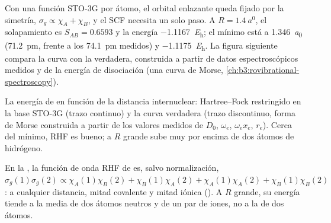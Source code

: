 \begin{example}\label{ex:b3:computational-chemistry:h2}
Con una función STO-3G por átomo, el orbital enlazante queda fijado por la simetría,
$\sigma_g \propto \chi_A + \chi_B$, y el SCF necesita un solo paso. A $R =
\qty{1.4}{\bohr}$, el solapamiento es $S_{AB} = 0.6593$ y la energía
\qty{-1.1167}{\hartree}; el mínimo está a \qty{1.346}{\bohr} (\qty{71.2}{pm},
frente a los \qty{74.1}{pm} medidos) y \qty{-1.1175}{\hartree}. La figura siguiente
compara la curva con la verdadera, construida a partir de datos espectroscópicos
medidos y de la energía de disociación (una curva de Morse, \cref{ch:b3:rovibrational-spectroscopy}).
\end{example}

\begin{omfigure}

{\small La energía de  en función de la distancia internuclear: Hartree--Fock
restringido en la base STO-3G (trazo continuo) y la curva verdadera (trazo discontinuo, forma
de Morse construida a partir de los valores medidos de $D_0$, $\omega_e$, $\omega_ex_e$, $r_e$). Cerca del
mínimo, RHF es bueno; a $R$ grande sube muy por encima de dos átomos de hidrógeno.}
\end{omfigure}

\begin{proposition}\label{prop:b3:computational-chemistry:rhf-dissociation}
En la , la función de onda RHF de  es, salvo
normalización, $\sigma_g(1)\sigma_g(2) \propto \chi_A(1)\chi_B(2) + \chi_B(1)\chi_A(2)
+ \chi_A(1)\chi_A(2) + \chi_B(1)\chi_B(2)$: a cualquier distancia, mitad covalente y mitad
iónica (). A $R$ grande, su energía tiende a la media de dos átomos
neutros y de un par de iones, no a la de dos átomos.
\end{proposition}

